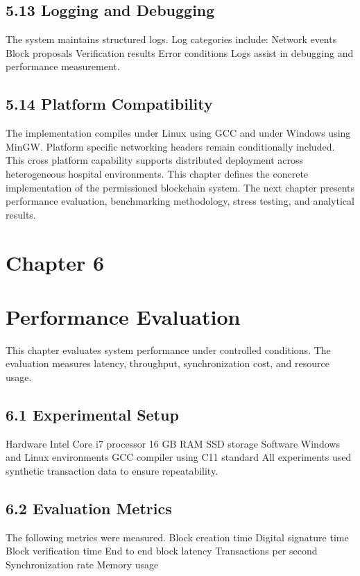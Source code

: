 \subsection*{5.13 Logging and Debugging}
The system maintains structured logs.
Log categories include:
Network events
Block proposals
Verification results
Error conditions
Logs assist in debugging and performance measurement.

\subsection*{5.14 Platform Compatibility}
The implementation compiles under Linux using GCC and under Windows using MinGW. Platform specific networking headers remain conditionally included.
This cross platform capability supports distributed deployment across heterogeneous hospital environments.
This chapter defines the concrete implementation of the permissioned blockchain system. The next chapter presents performance evaluation, benchmarking methodology, stress testing, and analytical results.

\newpage
\section*{Chapter 6}
\label{ch:6}

\section*{Performance Evaluation}
This chapter evaluates system performance under controlled conditions. The evaluation measures latency, throughput, synchronization cost, and resource usage.

\subsection*{6.1 Experimental Setup}
Hardware
Intel Core i7 processor
16 GB RAM
SSD storage
Software
Windows and Linux environments
GCC compiler using C11 standard
All experiments used synthetic transaction data to ensure repeatability.

\subsection*{6.2 Evaluation Metrics}
The following metrics were measured.
Block creation time
Digital signature time
Block verification time
End to end block latency
Transactions per second
Synchronization rate
Memory usage

